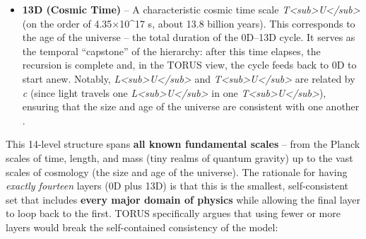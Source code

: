 \documentclass[]{article}
\begin{document}
{\begin{itemize}
  conditions, and it closely matches the observed universe size.
\item
  \textbf{13D (Cosmic Time)} -- A characteristic cosmic time scale
  \emph{T\textless{}sub\textgreater{}U\textless{}/sub\textgreater{}} (on
  the order of 4.35×10\^{}17 s, about 13.8 billion years)​. This
  corresponds to the age of the universe -- the total duration of the
  0D--13D cycle. It serves as the temporal ``capstone'' of the
  hierarchy: after this time elapses, the recursion is complete and, in
  the TORUS view, the cycle feeds back to 0D to start anew. Notably,
  \emph{L\textless{}sub\textgreater{}U\textless{}/sub\textgreater{}} and
  \emph{T\textless{}sub\textgreater{}U\textless{}/sub\textgreater{}} are
  related by \emph{c} (since light travels one
  \emph{L\textless{}sub\textgreater{}U\textless{}/sub\textgreater{}} in
  one
  \emph{T\textless{}sub\textgreater{}U\textless{}/sub\textgreater{}}),
  ensuring that the size and age of the universe are consistent with one
  another​.
\end{itemize}

This 14-level structure spans \textbf{all known fundamental scales} --
from the Planck scales of time, length, and mass (tiny realms of quantum
gravity) up to the vast scales of cosmology (the size and age of the
universe)​. The rationale for having \emph{exactly fourteen} layers (0D
plus 13D) is that this is the smallest, self-consistent set that
includes \textbf{every major domain of physics} while allowing the final
layer to loop back to the first. TORUS specifically argues that using
fewer or more layers would break the self-contained consistency of the
model:

}
\end{document}
